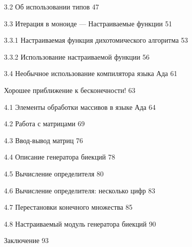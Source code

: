 \documentclass{mai_book}
\begin{document}
{    3.2 Об использовании типов \dotfill \hspace{0.5cm} 47
    
    3.3 Итерация в моноиде — Настраиваемые функции \dotfill \hspace{0.5cm} 51
    
    \hspace{0.5cm} 3.3.1 Настраиваемая функция дихотомического алгоритма \dotfill \hspace{0.5cm} 53 
    
    \hspace{0.5cm} 3.3.2 Использование настраиваемой функции \dotfill \hspace{0.5cm} 56 
    
    3.4 Необычное использование компилятора языка Ада \dotfill \hspace{0.5cm} 61 
    
 \hspace{0.05cm} Хорошее приближение к бесконечности! \dotfill \hspace{0.5cm} 63 
    
    4.1 Элементы обработки массивов в языке Ада \dotfill \hspace{0.5cm} 64 
    
    4.2 Работа с матрицами \dotfill \hspace{0.5cm} 69 
    
    4.3 Ввод-вывод матриц  \dotfill \hspace{0.5cm} 76 
    
    4.4 Описание генератора биекций \dotfill \hspace{0.5cm} 78 
    
\newpage
{}
    
    4.5 Вычисление определителя \dotfill \hspace{0.5cm} 80 
    
    4.6 Вычисление определителя: несколько цифр \dotfill \hspace{0.5cm} 83 
    
    4.7 Перестановки конечного множества \dotfill \hspace{0.5cm} 85 
    
    4.8 Настраиваемый модуль генератора биекций \dotfill \hspace{0.5cm} 90 
    
 \hspace{0.05cm} Заключение \dotfill \hspace{0.5cm} 93
    
}
\end{document}
